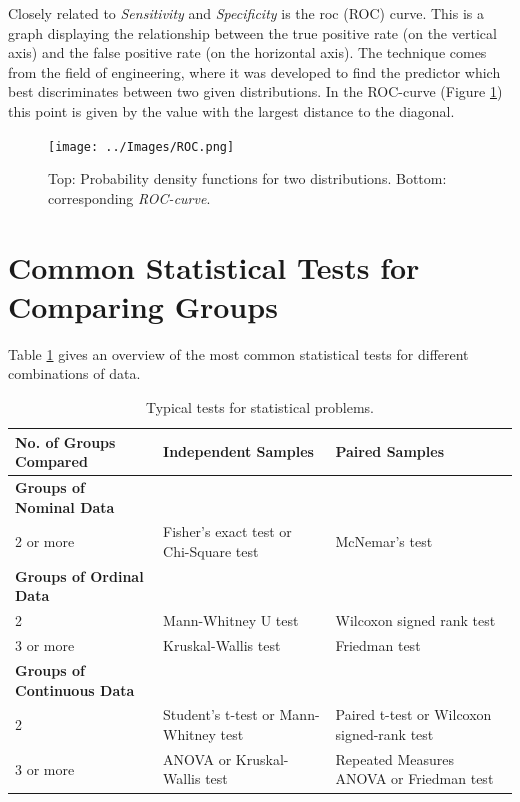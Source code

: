 Closely related to \emph{Sensitivity} and \emph{Specificity} is the \acrfull{roc} (ROC) curve. This is a graph displaying the relationship between the true positive rate (on the vertical axis) and the false positive rate (on the horizontal axis). The technique comes from the field of engineering, where it was developed to find the predictor which best discriminates between two given distributions. In the ROC-curve (Figure \ref{fig:ROC}) this point is given by the value with the largest distance to the diagonal.

\begin{figure}[ht]
  \centering
  \texttt{[image: ../Images/ROC.png]}\\
  \caption{Top: Probability density functions for two distributions. Bottom: corresponding \emph{ROC-curve}.}\label{fig:ROC}
\end{figure}

\section{Common Statistical Tests for Comparing Groups}

Table \ref{table:tests} gives an overview of the most common statistical tests for different combinations of data.
\begin{table}
  \centering
  \footnotesize{
  \begin{tabular}{ | p{5cm} || p{5cm} | p{5cm} | }
     \hline
     No. of Groups Compared  & \textbf{Independent Samples} & \textbf{Paired Samples} \\ \hline
     \textbf{Groups of Nominal Data} & & \\ \hline
     2 or more & Fisher's exact test or Chi-Square test & McNemar's test \\ \hline
     \textbf{Groups of Ordinal Data} & & \\ \hline
     2 & Mann-Whitney U test & Wilcoxon signed rank test \\ \hline
     3 or more & Kruskal-Wallis test & Friedman test \\ \hline
     \textbf{Groups of Continuous Data} & & \\ \hline
     2 & Student's t-test or Mann-Whitney test & Paired t-test or Wilcoxon signed-rank test \\ \hline
     3 or more & ANOVA or Kruskal-Wallis test & Repeated Measures ANOVA or Friedman test \\ \hline

  \end{tabular}
  }

  \caption{Typical tests for statistical problems.}\label{table:tests}
\end{table}

